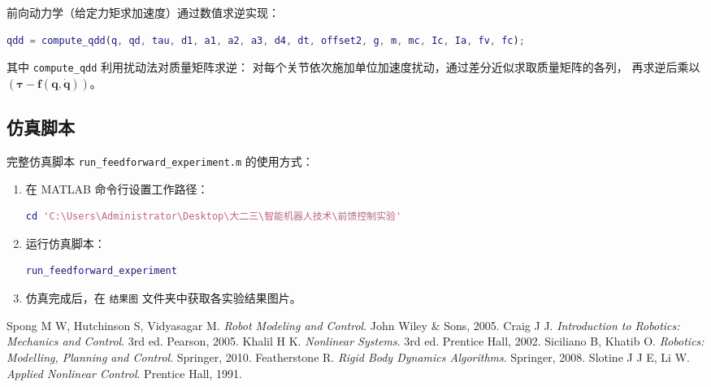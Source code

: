 \documentclass[12pt,a4paper,oneside]{article}
\numberwithin{equation}{section}
\newcommand{\bb}[1]{\mathbf{#1}}
\begin{document}
前向动力学（给定力矩求加速度）通过数值求逆实现：

\begin{lstlisting}[language=Matlab]
% 计算 M^{-1}(tau - f)，得到 qdd
qdd = compute_qdd(q, qd, tau, d1, a1, a2, a3, d4, dt, offset2, g, m, mc, Ic, Ia, fv, fc);
\end{lstlisting}

其中 \texttt{compute\_qdd} 利用扰动法对质量矩阵求逆：
对每个关节依次施加单位加速度扰动，通过差分近似求取质量矩阵的各列，
再求逆后乘以 $(\bb{\tau} - \bb{f}(\bb{q},\dot{\bb{q}}))$。

\subsection{仿真脚本}

完整仿真脚本 \texttt{run\_feedforward\_experiment.m} 的使用方式：

\begin{enumerate}
    \item 在 MATLAB 命令行设置工作路径：
    \begin{lstlisting}[language=Matlab]
cd 'C:\Users\Administrator\Desktop\大二三\智能机器人技术\前馈控制实验'
    \end{lstlisting}
    \item 运行仿真脚本：
    \begin{lstlisting}[language=Matlab]
run_feedforward_experiment
    \end{lstlisting}
    \item 仿真完成后，在 \texttt{结果图} 文件夹中获取各实验结果图片。
\end{enumerate}

\begin{thebibliography}{99}
     Spong M W, Hutchinson S, Vidyasagar M. \textit{Robot Modeling and Control}. John Wiley \& Sons, 2005.
     Craig J J. \textit{Introduction to Robotics: Mechanics and Control}. 3rd ed. Pearson, 2005.
     Khalil H K. \textit{Nonlinear Systems}. 3rd ed. Prentice Hall, 2002.
     Siciliano B, Khatib O. \textit{Robotics: Modelling, Planning and Control}. Springer, 2010.
     Featherstone R. \textit{Rigid Body Dynamics Algorithms}. Springer, 2008.
     Slotine J J E, Li W. \textit{Applied Nonlinear Control}. Prentice Hall, 1991.
\end{thebibliography}
\end{document}

